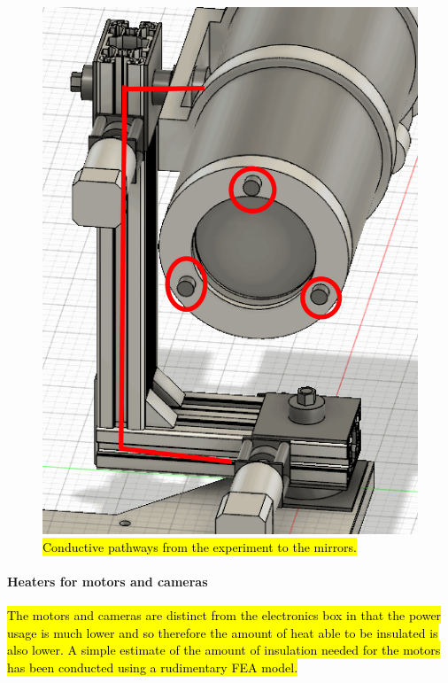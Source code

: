 	\begin{figure}[H]
    \centering	
	\includegraphics[scale=0.5]{4-experiment-design/img/mechanical/thermalpaths.PNG}
	\caption{\hl{Conductive pathways from the experiment to the mirrors.}}
	\label{fig:thermalpaths}
    	\end{figure}


\paragraph{Heaters for motors and cameras}
\hl{The motors and cameras are distinct from the electronics box in that the power usage is much lower and so therefore the amount of heat able to be insulated is also lower. A simple estimate of the amount of insulation needed for the motors has been conducted using a rudimentary FEA model.}\\

